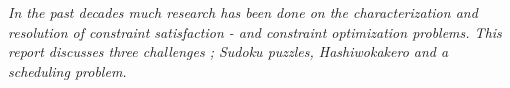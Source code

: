 \documentclass{misc/theme}
\newcommand{\block}[1]{\vspace{1.2cm}\begin{changemargin}{2.5cm}{2.5cm}\large\textit{#1}\end{changemargin}\vspace{0.6cm}}
\newcommand{\fakesection}[1]{%
  \par\refstepcounter{section}%
  \sectionmark{#1}%
  \addcontentsline{toc}{section}{\protect\numberline{\thesection}#1}%
}
\begin{document}
\maketitle
\tableofcontents

%
%

\block{In the past decades much research has been done on the characterization and resolution of constraint satisfaction - and constraint optimization problems. This report discusses three challenges ; Sudoku puzzles, Hashiwokakero and a scheduling problem.}

%
% 



%
% 



%
% 



%
%

\newpage
\appendix


% 
%


\end{document}

